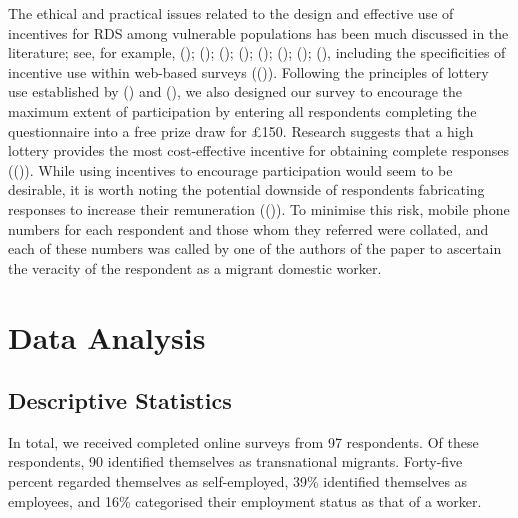 \documentclass[
  12pt,
]{article}
\theoremstyle{plain}
\theoremstyle{definition}
\begin{document}
The ethical and practical issues related to the design and effective use
of incentives for RDS among vulnerable populations has been much
discussed in the literature; see, for example,
();
();
();
();
();
();
();
(),
including the specificities of incentive use within web-based surveys
(()).
Following the principles of lottery use established by
() and
(), we
also designed our survey to encourage the maximum extent of
participation by entering all respondents completing the questionnaire
into a free prize draw for £150. Research suggests that a high lottery
provides the most cost-effective incentive for obtaining complete
responses
(()).
While using incentives to encourage participation would seem to be
desirable, it is worth noting the potential downside of respondents
fabricating responses to increase their remuneration
(()).
To minimise this risk, mobile phone numbers for each respondent and
those whom they referred were collated, and each of these numbers was
called by one of the authors of the paper to ascertain the veracity of
the respondent as a migrant domestic worker.

\section{Data Analysis}\label{data-analysis}

\subsection{Descriptive Statistics}\label{descriptive-statistics}

In total, we received completed online surveys from 97 respondents. Of
these respondents, 90 identified themselves as transnational migrants.
Forty-five percent regarded themselves as self-employed, 39\% identified
themselves as employees, and 16\% categorised their employment status as
that of a worker.
\end{document}

